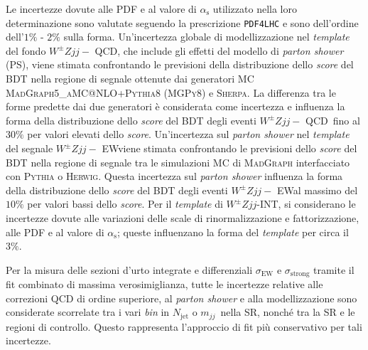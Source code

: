 \documentclass[11pt]{article}
\newcommand{\wzjjew}{$W^\pm Z jj-$ EW}
\newcommand{\wzjjqcd}{$W^\pm Z jj-$ QCD}
\newcommand{\wzjj}{$W^\pm Z jj$}
\newcommand{\mjj}{\ensuremath{m_{jj}}}
\begin{document}
Le incertezze dovute alle PDF e al valore di $\alpha_{\mathrm{s}}$ utilizzato nella loro determinazione sono valutate seguendo la prescrizione \texttt{PDF4LHC} e sono dell'ordine dell'$1\%$ - $2\%$ sulla forma. Un'incertezza globale di modellizzazione nel \textit{template} del fondo \wzjjqcd, che include gli effetti del modello di \textit{parton shower} (PS), viene stimata confrontando le previsioni della distribuzione dello \textit{score} del BDT nella regione di segnale ottenute dai generatori MC \textsc{MadGraph5\_aMC@NLO}+\textsc{Pythia8} (\textsc{MGPy8}) e \textsc{Sherpa}. La differenza tra le forme predette dai due generatori è considerata come incertezza e influenza la forma della distribuzione dello \textit{score} del BDT degli eventi \wzjjqcd\ fino al $30\%$ per valori elevati dello \textit{score}. Un'incertezza sul \textit{parton shower} nel \textit{template} del segnale \wzjjew viene stimata confrontando le previsioni dello \textit{score} del BDT nella regione di segnale tra le simulazioni MC di \textsc{MadGraph} interfacciato con \textsc{Pythia} o \textsc{Herwig}. Questa incertezza sul \textit{parton shower} influenza la forma della distribuzione dello \textit{score} del BDT degli eventi \wzjjew al massimo del $10\%$ per valori bassi dello \textit{score}. Per il \textit{template} di \wzjj-INT, si considerano le incertezze dovute alle variazioni delle scale di rinormalizzazione e fattorizzazione, alle PDF e al valore di $\alpha_{\mathrm{s}}$; queste influenzano la forma del \textit{template} per circa il $3\%$.

Per la misura delle sezioni d'urto integrate e differenziali $\sigma_{\text{EW}}$ e $\sigma_{\text{strong}}$ tramite il fit combinato di massima verosimiglianza, tutte le incertezze relative alle correzioni QCD di ordine superiore, al \textit{parton shower} e alla modellizzazione sono considerate scorrelate tra i vari \textit{bin} in $N_{\text{jet}}$ o \mjj\ nella SR, nonché tra la SR e le regioni di controllo. Questo rappresenta l'approccio di fit più conservativo per tali incertezze.
\end{document}
